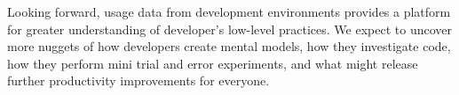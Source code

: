 \documentclass{book}
\begin{document}
Looking forward, usage data from development environments provides a platform for greater understanding of developer's low-level practices.  We expect to uncover more nuggets of how developers create mental models, how they investigate code, how they perform mini trial and error experiments, and what might release further productivity improvements for everyone.










\end{document}
